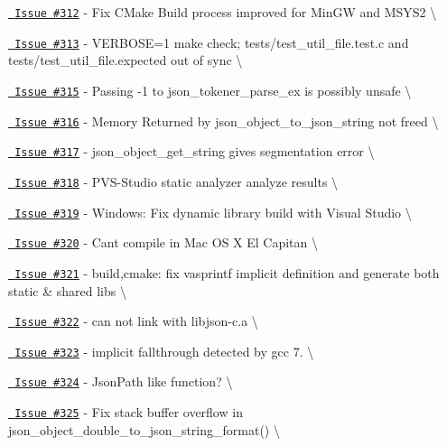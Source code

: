 \begin{DoxyItemize}
\item \href{https://github.com/json-c/json-c/issues/312}{\texttt{ Issue \#312}} -\/ Fix CMake Build process improved for Min\+GW and MSYS2 \textbackslash{}
\item \href{https://github.com/json-c/json-c/issues/313}{\texttt{ Issue \#313}} -\/ VERBOSE=1 make check; tests/test\+\_\+util\+\_\+file.\+test.\+c and tests/test\+\_\+util\+\_\+file.\+expected out of sync \textbackslash{}
\item \href{https://github.com/json-c/json-c/issues/315}{\texttt{ Issue \#315}} -\/ Passing -\/1 to json\+\_\+tokener\+\_\+parse\+\_\+ex is possibly unsafe \textbackslash{}
\item \href{https://github.com/json-c/json-c/issues/316}{\texttt{ Issue \#316}} -\/ Memory Returned by json\+\_\+object\+\_\+to\+\_\+json\+\_\+string not freed \textbackslash{}
\item \href{https://github.com/json-c/json-c/issues/317}{\texttt{ Issue \#317}} -\/ json\+\_\+object\+\_\+get\+\_\+string gives segmentation error \textbackslash{}
\item \href{https://github.com/json-c/json-c/issues/318}{\texttt{ Issue \#318}} -\/ PVS-\/\+Studio static analyzer analyze results \textbackslash{}
\item \href{https://github.com/json-c/json-c/issues/319}{\texttt{ Issue \#319}} -\/ Windows\+: Fix dynamic library build with Visual Studio \textbackslash{}
\item \href{https://github.com/json-c/json-c/issues/320}{\texttt{ Issue \#320}} -\/ Can\textquotesingle{}t compile in Mac OS X El Capitan \textbackslash{}
\item \href{https://github.com/json-c/json-c/issues/321}{\texttt{ Issue \#321}} -\/ build,cmake\+: fix vasprintf implicit definition and generate both static \& shared libs \textbackslash{}
\item \href{https://github.com/json-c/json-c/issues/322}{\texttt{ Issue \#322}} -\/ can not link with libjson-\/c.\+a \textbackslash{}
\item \href{https://github.com/json-c/json-c/issues/323}{\texttt{ Issue \#323}} -\/ implicit fallthrough detected by gcc 7. \textbackslash{}
\item \href{https://github.com/json-c/json-c/issues/324}{\texttt{ Issue \#324}} -\/ Json\+Path like function? \textbackslash{}
\item \href{https://github.com/json-c/json-c/issues/325}{\texttt{ Issue \#325}} -\/ Fix stack buffer overflow in json\+\_\+object\+\_\+double\+\_\+to\+\_\+json\+\_\+string\+\_\+format() \textbackslash{}

\end{DoxyItemize}

